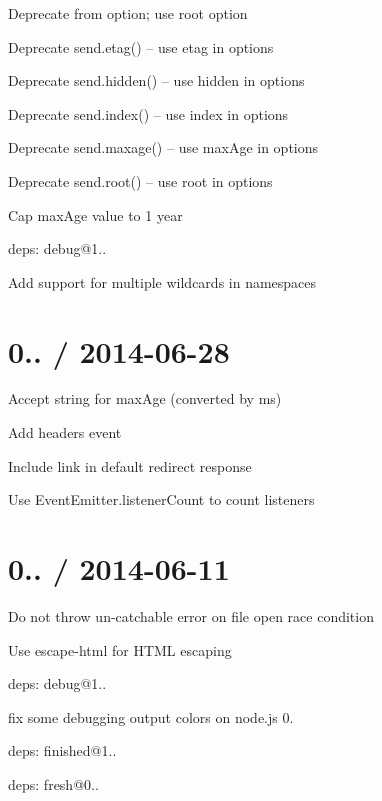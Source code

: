 \begin{DoxyItemize}
\item Deprecate {\ttfamily from} option; use {\ttfamily root} option
\item Deprecate {\ttfamily send.\+etag()} -- use {\ttfamily etag} in {\ttfamily options}
\item Deprecate {\ttfamily send.\+hidden()} -- use {\ttfamily hidden} in {\ttfamily options}
\item Deprecate {\ttfamily send.\+index()} -- use {\ttfamily index} in {\ttfamily options}
\item Deprecate {\ttfamily send.\+maxage()} -- use {\ttfamily max\+Age} in {\ttfamily options}
\item Deprecate {\ttfamily send.\+root()} -- use {\ttfamily root} in {\ttfamily options}
\item Cap {\ttfamily max\+Age} value to 1 year
\item deps\+: debug@1..
\begin{DoxyItemize}
\item Add support for multiple wildcards in namespaces
\end{DoxyItemize}
\end{DoxyItemize}

\section*{0.. / 2014-\/06-\/28 }


\begin{DoxyItemize}
\item Accept string for {\ttfamily max\+Age} (converted by {\ttfamily ms})
\item Add {\ttfamily headers} event
\item Include link in default redirect response
\item Use {\ttfamily Event\+Emitter.\+listener\+Count} to count listeners
\end{DoxyItemize}

\section*{0.. / 2014-\/06-\/11 }


\begin{DoxyItemize}
\item Do not throw un-\/catchable error on file open race condition
\item Use {\ttfamily escape-\/html} for H\+T\+ML escaping
\item deps\+: debug@1..
\begin{DoxyItemize}
\item fix some debugging output colors on node.\+js 0.
\end{DoxyItemize}
\item deps\+: finished@1..
\item deps\+: fresh@0..
\end{DoxyItemize}

